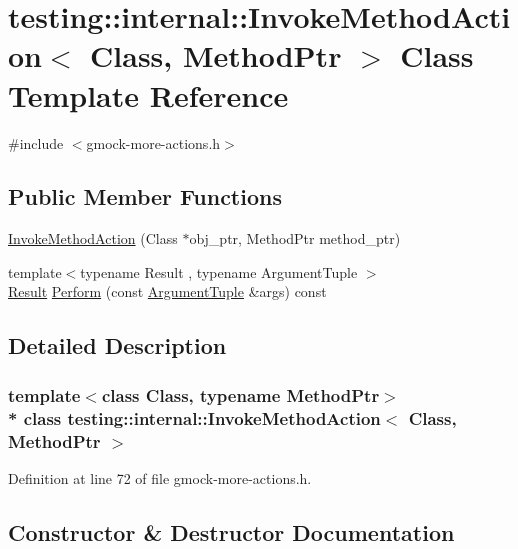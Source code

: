 \hypertarget{classtesting_1_1internal_1_1_invoke_method_action}{}\section{testing\+:\+:internal\+:\+:Invoke\+Method\+Action$<$ Class, Method\+Ptr $>$ Class Template Reference}
\label{classtesting_1_1internal_1_1_invoke_method_action}


{\ttfamily \#include $<$gmock-\/more-\/actions.\+h$>$}

\subsection*{Public Member Functions}
\begin{DoxyCompactItemize}
\item 
\hyperlink{classtesting_1_1internal_1_1_invoke_method_action_a16e545f6166e2d54eeafdc2ab3adf06b}{Invoke\+Method\+Action} (Class $\ast$obj\+\_\+ptr, Method\+Ptr method\+\_\+ptr)
\item 
{\footnotesize template$<$typename Result , typename Argument\+Tuple $>$ }\\\hyperlink{typedefs__d_8js_a28287671eaf7406afd604bd055ba4066}{Result} \hyperlink{classtesting_1_1internal_1_1_invoke_method_action_ad38f42621339fd3589227019610c21a5}{Perform} (const \hyperlink{typedefs__d_8js_a396b2bdc7ef45f482a7e9254b15c3c01}{Argument\+Tuple} \&args) const 
\end{DoxyCompactItemize}


\subsection{Detailed Description}
\subsubsection*{template$<$class Class, typename Method\+Ptr$>$\\*
class testing\+::internal\+::\+Invoke\+Method\+Action$<$ Class, Method\+Ptr $>$}



Definition at line 72 of file gmock-\/more-\/actions.\+h.



\subsection{Constructor \& Destructor Documentation}
